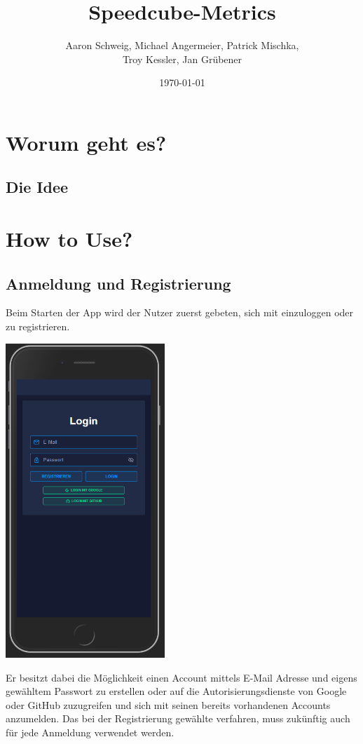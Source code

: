 \documentclass[a4paper]{article}
\title{Speedcube-Metrics}
\author{Aaron Schweig, Michael Angermeier, Patrick Mischka, \\ Troy Kessler, Jan Grübener}
\date{{\today}}
\theoremstyle{definition}
\begin{document}
	\maketitle
	\section{Worum geht es?}
	\subsection{Die Idee}
	\section{How to Use?}
	\subsection*{Anmeldung und Registrierung}
	Beim Starten der App wird der Nutzer zuerst gebeten, sich mit einzuloggen oder zu registrieren. 
	\begin{center}
		\includegraphics[width= 6cm, keepaspectratio]{img/login}
	\end{center}
	Er besitzt dabei die Möglichkeit einen Account mittels E-Mail Adresse und eigens gewähltem Passwort zu erstellen oder auf die Autorisierungsdienste von Google oder GitHub zuzugreifen und sich mit seinen bereits vorhandenen Accounts anzumelden. Das bei der Registrierung gewählte verfahren, muss zukünftig auch für jede Anmeldung verwendet werden.
\end{document}
